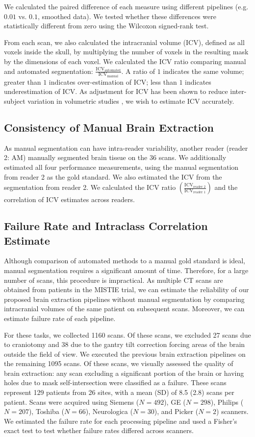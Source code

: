\documentclass{elsarticle}\usepackage[]{graphicx}\usepackage[]{color}
\begin{document}
We calculated the paired difference of each measure using different pipelines (e.g. $0.01$ vs. $0.1$, smoothed data).  We tested whether these differences were statistically different from zero using the Wilcoxon signed-rank test.

From each scan, we also calculated the intracranial volume (ICV), defined as all voxels inside the skull, by multiplying the number of voxels in the resulting mask by the dimensions of each voxel.  We calculated the ICV ratio comparing manual and automated segmentation: $\frac{\text{ICV}_{\text{automated}}}{\text{ICV}_{\text{manual}}}$.  A ratio of $1$ indicates the same volume; greater than $1$ indicates over-estimation of ICV; less than $1$ indicates underestimation of ICV.  As adjustment for ICV has been shown to reduce inter-subject variation in volumetric studies \citep{whitwell2001normalization}, we wish to estimate ICV accurately. 


\subsection{Consistency of Manual Brain Extraction}
As manual segmentation can have intra-reader variability, another reader (reader 2: AM) manually segmented brain tissue on the 36 scans.  We additionally estimated all four performance measurements, using the manual segmentation from reader 2 as the gold standard.  We also estimated the ICV from the segmentation from reader 2.   We calculated the ICV ratio $\left(\frac{\text{ICV}_{\text{reader 2}}}{\text{ICV}_{\text{reader 1}}}\right)$ and the correlation of ICV estimates across readers.

\subsection{Failure Rate and Intraclass Correlation Estimate}
Although comparison of automated methods to a manual gold standard is ideal, manual segmentation requires a significant amount of time.  Therefore, for a large number of scans, this procedure is impractical.  As multiple CT scans are obtained from patients in the MISTIE trial, we can estimate the reliability of our proposed brain extraction pipelines without manual segmentation by comparing intracranial volumes of the same patient on subsequent scans.  Moreover, we can estimate failure rate of each pipeline.  

For these tasks, we collected 1160 scans.  Of these scans, we excluded 27 scans due to craniotomy and 38 due to the gantry tilt correction forcing areas of the brain outside the field of view.   We executed the previous brain extraction pipelines on the remaining 1095 scans.  Of these scans, we visually assessed the quality of brain extraction: any scan excluding a significant portion of the brain or having holes due to mask self-intersection were classified as a failure.  These scans represent 129 patients from 26 sites, with a mean (SD) of 8.5 (2.8) scans per patient.  Scans were acquired using Siemens ($N=492$), GE ($N=298$), Philips ($N=207$), Toshiba ($N=66$), Neurologica ($N=30$), and Picker ($N=2$) scanners.  We estimated the failure rate for each processing pipeline and used a Fisher's exact test to test whether failure rates differed across scanners.
\end{document}
